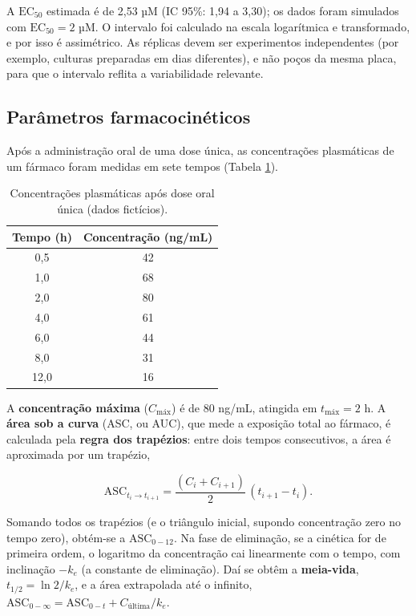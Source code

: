 \documentclass[
]{book}
\begin{document}
A \(\text{EC}_{50}\) estimada é de 2,53 µM (IC 95\%: 1,94 a 3,30); os dados foram simulados com \(\text{EC}_{50} = 2\) µM. O intervalo foi calculado na escala logarítmica e transformado, e por isso é assimétrico. As réplicas devem ser experimentos independentes (por exemplo, culturas preparadas em dias diferentes), e não poços da mesma placa, para que o intervalo reflita a variabilidade relevante.

\subsection{Parâmetros farmacocinéticos}\label{paruxe2metros-farmacocinuxe9ticos}

Após a administração oral de uma dose única, as concentrações plasmáticas de um fármaco foram medidas em sete tempos (Tabela \ref{tab:apl-pk}).

\begin{table}

\caption{\label{tab:apl-pk}Concentrações plasmáticas após dose oral única (dados fictícios).}
\centering
\begin{tabular}[t]{c|c}
\hline
Tempo (h) & Concentração (ng/mL)\\
\hline
0,5 & 42\\
\hline
1,0 & 68\\
\hline
2,0 & 80\\
\hline
4,0 & 61\\
\hline
6,0 & 44\\
\hline
8,0 & 31\\
\hline
12,0 & 16\\
\hline
\end{tabular}
\end{table}

A \textbf{concentração máxima} (\(C_{\text{máx}}\)) é de 80 ng/mL, atingida em \(t_{\text{máx}} = 2\) h. A \textbf{área sob a curva} (ASC, ou AUC), que mede a exposição total ao fármaco, é calculada pela \textbf{regra dos trapézios}: entre dois tempos consecutivos, a área é aproximada por um trapézio,

\[
\text{ASC}_{t_i \to t_{i+1}} = \frac{(C_i + C_{i+1})}{2}\,(t_{i+1} - t_i).
\]

Somando todos os trapézios (e o triângulo inicial, supondo concentração zero no tempo zero), obtém-se a \(\text{ASC}_{0-12}\). Na fase de eliminação, se a cinética for de primeira ordem, o logaritmo da concentração cai linearmente com o tempo, com inclinação \(-k_e\) (a constante de eliminação). Daí se obtêm a \textbf{meia-vida}, \(t_{1/2} = \ln 2 / k_e\), e a área extrapolada até o infinito, \(\text{ASC}_{0-\infty} = \text{ASC}_{0-t} + C_{\text{última}}/k_e\).
\end{document}
